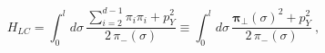 \begin{equation}
\label{eq:py string Hamiltonian}
   H_{LC} = \int_0^l d\sigma \, \frac{
                     \sum_{i=2}^{d-1} \pi_i \pi_i + p_Y^2}
                     {2 \, \pi_-(\sigma)} \equiv
           \int_0^l d\sigma \, \frac{
                     \bm{\pi}_{\perp}(\sigma)^2 + p_Y^2}
                     {2 \, \pi_-(\sigma)}\ ,
\end{equation}

